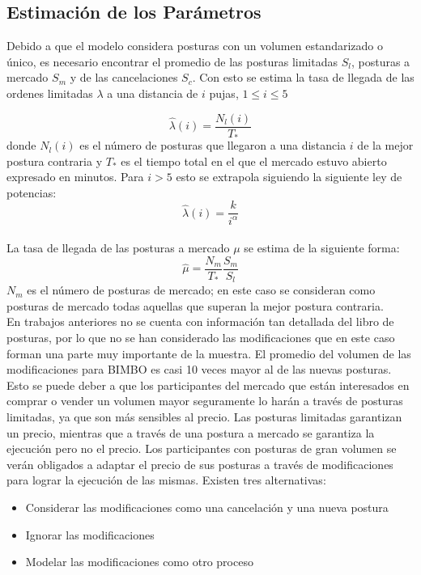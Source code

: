 \documentclass[11pt]{article}
\numberwithin{equation}{section} %
\begin{document}
\subsection{Estimación de los Parámetros}

Debido a que el modelo considera posturas con un volumen estandarizado o único, es necesario encontrar el promedio de las posturas limitadas $S_l$, posturas a mercado $S_m$ y de las cancelaciones $S_c$. Con esto se estima la tasa de llegada de las ordenes limitadas $\lambda$ a una distancia de $i$ pujas, $1\leq i \leq 5$

\[
\hat{\lambda}(i)=\frac{N_l(i)}{T_*}
\]
donde $N_l(i)$ es el número de posturas que llegaron a una distancia $i$ de la mejor postura contraria y $T_*$ es el tiempo total en el que el mercado estuvo abierto expresado en minutos. Para $i>5$ esto se extrapola siguiendo la siguiente ley de potencias:
\[
\hat{\lambda}(i)=\frac{k}{i^\alpha}
\]\\

La tasa de llegada de las posturas a mercado $\mu$ se estima de la siguiente forma:
\[
\hat{\mu}=\frac{N_m}{T_*}\frac{S_m}{S_l}
\]
$N_m$ es el número de posturas de mercado; en este caso se consideran como posturas de mercado todas aquellas que superan la mejor postura contraria.\\

En trabajos anteriores no se cuenta con información tan detallada del libro de posturas, por lo que no se han considerado las modificaciones que en este caso forman una parte muy importante de la muestra. El promedio del volumen de las modificaciones para BIMBO es casi 10 veces mayor al de las nuevas posturas. Esto se puede deber a que los participantes del mercado que están interesados en comprar o vender un volumen mayor seguramente lo harán a través de posturas limitadas, ya que son más sensibles al precio. Las posturas limitadas garantizan un precio, mientras que a través de una postura a mercado se garantiza la ejecución pero no el precio. Los participantes con posturas de gran volumen se verán obligados a adaptar el precio de sus posturas a través de modificaciones para lograr la ejecución de las mismas. Existen tres alternativas:
\begin{itemize}
  \item Considerar las modificaciones como una cancelación y una nueva postura
  \item Ignorar las modificaciones
  \item Modelar las modificaciones como otro proceso\\
\end{itemize}
\end{document}
